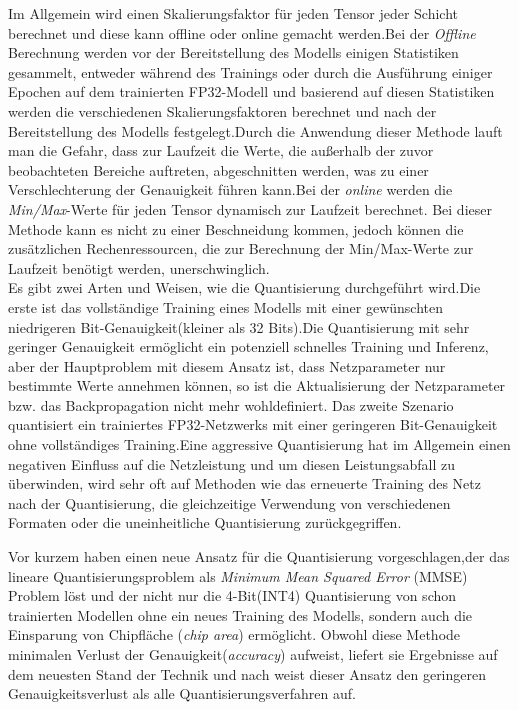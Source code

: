 \documentclass[12pt,a4paper]{scrartcl}
\numberwithin{equation}{section}
\begin{document}
Im Allgemein wird  einen Skalierungsfaktor für jeden Tensor jeder Schicht berechnet und diese kann offline oder online gemacht werden.Bei der \textit{Offline} Berechnung werden vor der Bereitstellung des Modells einigen Statistiken gesammelt, entweder während des Trainings oder durch die Ausführung einiger Epochen auf dem trainierten FP32-Modell und basierend auf diesen Statistiken werden die verschiedenen Skalierungsfaktoren berechnet und nach der Bereitstellung des Modells festgelegt.Durch die Anwendung dieser Methode lauft man die Gefahr, dass zur Laufzeit die Werte, die außerhalb der zuvor beobachteten Bereiche auftreten, abgeschnitten werden, was zu einer Verschlechterung der Genauigkeit führen kann.Bei der \textit{online} werden die \textit{Min/Max}-Werte für jeden Tensor dynamisch zur Laufzeit berechnet. Bei dieser Methode kann es nicht zu einer Beschneidung kommen, jedoch können die zusätzlichen Rechenressourcen, die zur Berechnung der Min/Max-Werte zur Laufzeit benötigt werden, unerschwinglich.\cite{quantization1}\\

Es gibt zwei Arten und Weisen, wie die Quantisierung durchgeführt wird.Die erste ist das vollständige Training eines Modells mit einer gewünschten niedrigeren Bit-Genauigkeit(kleiner als 32 Bits).Die Quantisierung mit sehr geringer Genauigkeit ermöglicht ein potenziell schnelles Training und Inferenz, aber der Hauptproblem mit diesem Ansatz ist, dass Netzparameter nur bestimmte Werte annehmen können, so ist die Aktualisierung der Netzparameter bzw. das Backpropagation nicht mehr wohldefiniert.
Das zweite Szenario  quantisiert ein trainiertes FP32-Netzwerks mit einer geringeren Bit-Genauigkeit ohne vollständiges Training.Eine aggressive Quantisierung hat im Allgemein einen negativen Einfluss auf die Netzleistung und um diesen Leistungsabfall zu überwinden, wird sehr oft auf Methoden wie das erneuerte Training des Netz nach der Quantisierung, die gleichzeitige Verwendung von verschiedenen Formaten oder die uneinheitliche Quantisierung zurückgegriffen.

Vor kurzem haben \cite[Yoni et al]{quantizationYoni} einen neue Ansatz für die Quantisierung vorgeschlagen,der das lineare Quantisierungsproblem als \textit{Minimum Mean Squared Error} (MMSE) Problem löst und der nicht nur die 4-Bit(INT4) Quantisierung von schon trainierten Modellen ohne ein neues Training des Modells, sondern auch die Einsparung von Chipfläche (\textit{chip area}) ermöglicht. Obwohl diese Methode  minimalen Verlust der Genauigkeit(\textit{accuracy}) aufweist, liefert sie Ergebnisse auf dem neuesten Stand der Technik und nach \cite{quantizationYoni} weist dieser Ansatz den geringeren Genauigkeitsverlust als alle Quantisierungsverfahren auf.
\end{document}
